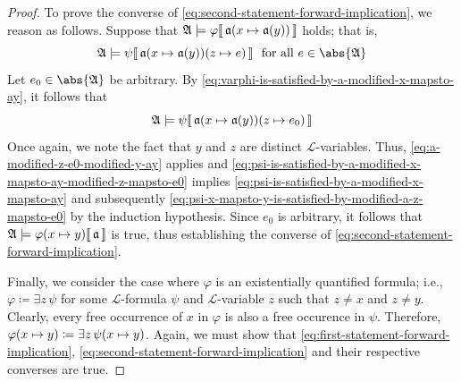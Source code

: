 \begin{proof}
    \vspace{0.3cm}
    \noindent
    To prove the converse of \eqref{eq:second-statement-forward-implication}, we reason as follows.
    Suppose that \( \folwffsatisfaction{\mathfrak{A}}{\varphi}{ \folmodifiedvariableassignmentfunction{\mathfrak{a}}{x}{\mathfrak{a}(y)} } \) holds; that is,
    \begin{equation}
        \label{eq:varphi-is-satisfied-by-a-modified-x-mapsto-ay}
        \folwffsatisfaction{\mathfrak{A}}{ \psi }{ \folmodifiedvariableassignmentfunction{ \folmodifiedvariableassignmentfunction{\mathfrak{a}}{x}{\mathfrak{a}(y)} }{z}{e} }
        \ \ \text{for all} \ e \in \abs{\mathfrak{A}} 
    \end{equation}
    Let \( e_{0} \in \abs{\mathfrak{A}} \) be arbitrary. By \eqref{eq:varphi-is-satisfied-by-a-modified-x-mapsto-ay}, it follows that
    \begin{equation}
        \label{eq:psi-is-satisfied-by-a-modified-x-mapsto-ay-modified-z-mapsto-e0}
        \folwffsatisfaction{\mathfrak{A}}{\psi}{ \folmodifiedvariableassignmentfunction{ \folmodifiedvariableassignmentfunction{\mathfrak{a}}{x}{\mathfrak{a}(y)} }{z}{e_{0}} }
    \end{equation}
    Once again, we note the fact that \( y \) and \( z \) are distinct \( \mathcal{L} \)-variables. Thus, \eqref{eq:a-modified-z-e0-modified-y-ay} applies
    and \eqref{eq:psi-is-satisfied-by-a-modified-x-mapsto-ay-modified-z-mapsto-e0} implies \eqref{eq:psi-is-satisfied-by-a-modified-x-mapsto-ay} and subsequently
    \eqref{eq:psi-x-mapsto-y-is-satisfied-by-modified-a-z-mapsto-e0} by the induction hypothesis.
    Since \( e_{0} \) is arbitrary, it follows that \( \folwffsatisfaction{\mathfrak{A}}{ \folfreevariablereplacement{\varphi}{x}{y} }{\mathfrak{a}} \) is true, thus
    establishing the converse of \eqref{eq:second-statement-forward-implication}.

    \vspace{0.3cm}
    \noindent
    Finally, we consider the case where \( \varphi \) is an existentially quantified formula; i.e., \( \varphi \coloneq \exists z \, \psi \) for some \( \mathcal{L} \)-formula
    \( \psi \) and \( \mathcal{L} \)-variable \( z \) such that \( z \neq x \) and \( z \neq y \).
    Clearly, every free occurrence of \( x \) in \( \varphi \) is also a free occurence in \( \psi \).
    Therefore, \( \folfreevariablereplacement{\varphi}{x}{y} \coloneq \exists z \, \folfreevariablereplacement{\psi}{x}{y} \).
    Again, we must show that \eqref{eq:first-statement-forward-implication}, \eqref{eq:second-statement-forward-implication} and their respective converses are true.


\end{proof}
